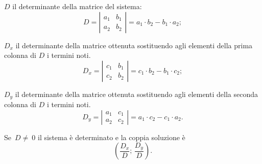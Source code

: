 \begin{enumeratea}
\item $D$ il determinante della matrice del sistema:
 \[D=\left|\begin{array}{cc}a_{1} & b_{1}\\ a_{2} & b_{2}\end{array}\right|=a_{1}\cdot b_{2}-b_{1}\cdot a_{2};\]
\item $D_{x}$ il determinante della matrice ottenuta sostituendo agli
elementi della prima colonna di $D$ i termini noti.
\[D_{x}=\left|\begin{array}{cc}c_{1} & b_{1}\\ c_{2} & b_{2}\end{array}\right|=c_{1}\cdot b_{2}-b_{1}\cdot c_{2};\]
\item $D_{y}$ il determinante della matrice ottenuta sostituendo agli
elementi della seconda colonna di $D$ i termini noti. 
\[D_{y}=\left|\begin{array}{cc}a_{1} & c_{1}\\ a_{2} & c_{2}\end{array}\right|=a_{1}\cdot c_{2}-c_{1}\cdot a_{2}.\] 
\end{enumeratea}

Se~$D\neq~0$ il sistema è determinato e la coppia
soluzione è
\begin{equation*}
\left(\frac{D_{x}}{D};\, \frac{D_{y}}{D}\right).
\end{equation*}

